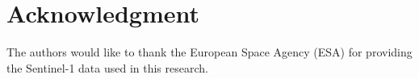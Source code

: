 \documentclass[journal]{IEEEtran}
\begin{document}
%

%



\section*{Acknowledgment}

The authors would like to thank the European Space Agency (ESA) for providing the Sentinel-1 data used in this research.


\ifCLASSOPTIONcaptionsoff
  \newpage
\fi







%
%
%
\end{document}
